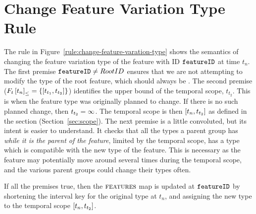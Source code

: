 \section{Change Feature Variation Type Rule}
\label{sec:change-feature-variation-type-rule}
The rule in Figure~\vref{rule:change-feature-varation-type} shows the semantics of changing the feature variation type of the feature with ID $\texttt{featureID}$ at time $t_n$. The first premise $\texttt{featureID} \neq RootID$ ensures that we are not attempting to modify the type of the root feature, which should always be \mandatory{}. The second premise ($\containing{F_t}{t_n} = \set{\interval{t_{t_1}}{t_{t_2}}}$) identifies the upper bound of the temporal scope, $t_{t_2}$. This is when the feature type was originally planned to change. If there is no such planned change, then $t_{t_2} = \infty$. The temporal scope is then $\interval{t_n}{t_{t_2}}$ as defined in the  section (Section~\vref{sec:scope}). The next premise is a little convoluted, but its intent is easier to understand. It checks that all the types a parent group has \emph{while it is the parent of the feature}, limited by the temporal scope, has a type which is compatible with the new type of the feature. This is necessary as the feature may potentially move around several times during the temporal scope, and the various parent groups could change their types often. 

If all the premises true, then the $\textsc{features}{}$ map is updated at $\texttt{featureID}$ by shortening the interval key for the original type at $t_n$, and assigning the new type to the temporal scope $\interval{t_n}{t_{t_2}}$. 

